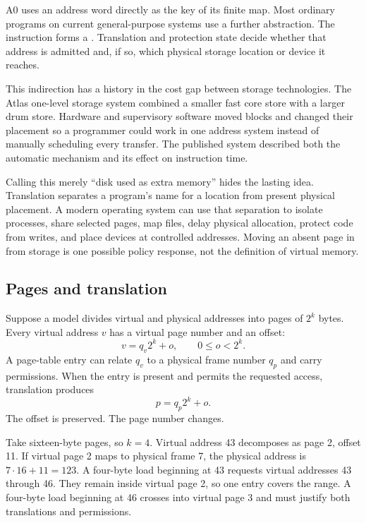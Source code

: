 A0 uses an address word directly as the key of its finite map. Most ordinary
programs on current general-purpose systems use a further abstraction. The
instruction forms a . Translation and protection
state decide whether that address is admitted and, if so, which physical
storage location or device it reaches.

This indirection has a history in the cost gap between storage technologies.
The Atlas one-level storage system combined a smaller fast core store with a
larger drum store. Hardware and supervisory software moved blocks and changed
their placement so a programmer could work in one address system instead of
manually scheduling every transfer. The published system described both the
automatic mechanism and its effect on instruction time.
\autocite{kilburn1962onelevel}

Calling this merely ``disk used as extra memory'' hides the lasting idea.
Translation separates a program's name for a location from present physical
placement. A modern operating system can use that separation to isolate
processes, share selected pages, map files, delay physical allocation, protect
code from writes, and place devices at controlled addresses. Moving an absent
page in from storage is one possible policy response, not the definition of
virtual memory.

\subsection{Pages and translation}

Suppose a model divides virtual and physical addresses into pages of \(2^k\)
bytes. Every virtual address \(v\) has a virtual page number and an offset:
\[
 v=q_v2^k+o,\qquad 0\leq o<2^k.
\]
A page-table entry can relate \(q_v\) to a physical frame number \(q_p\) and
carry permissions. When the entry is present and permits the requested access,
translation produces
\[
 p=q_p2^k+o.
\]
The offset is preserved. The page number changes.

Take sixteen-byte pages, so \(k=4\). Virtual address 43 decomposes as page 2,
offset 11. If virtual page 2 maps to physical frame 7, the physical address is
\(7\mathbin{\cdot}16+11=123\). A four-byte load beginning at 43 requests
virtual addresses 43 through 46. They remain inside virtual page 2, so one
entry covers the range. A four-byte load beginning at 46 crosses into virtual
page 3 and must justify both translations and permissions.

